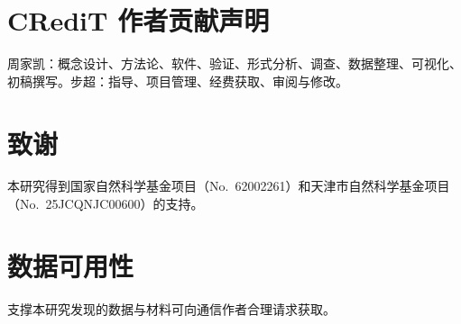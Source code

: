 \documentclass[11pt, a4paper, UTF8, fontset=fandol]{ctexart}
\begin{document}
\section*{CRediT 作者贡献声明}
周家凯：概念设计、方法论、软件、验证、形式分析、调查、数据整理、可视化、初稿撰写。步超：指导、项目管理、经费获取、审阅与修改。

\section*{致谢}
本研究得到国家自然科学基金项目（No.~62002261）和天津市自然科学基金项目（No.~25JCQNJC00600）的支持。

\section*{数据可用性}
支撑本研究发现的数据与材料可向通信作者合理请求获取。
\end{document}
